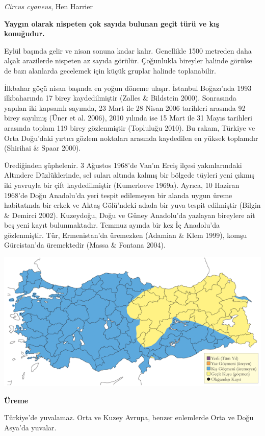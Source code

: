 \documentclass[
  letterpaper,
  DIV=11,
  numbers=noendperiod]{scrreprt}
\begin{document}
\emph{Circus cyaneus}, Hen Harrier

\textbf{Yaygın olarak nispeten çok sayıda bulunan geçit türü ve kış
konuğudur.}

Eylül başında gelir ve nisan sonuna kadar kalır. Genellikle 1500
metreden daha alçak arazilerde nispeten az sayıda görülür. Çoğunlukla
bireyler halinde görülse de bazı alanlarda gecelemek için küçük gruplar
halinde toplanabilir.

İlkbahar göçü nisan başında en yoğun döneme ulaşır. İstanbul Boğazı'nda
1993 ilkbaharında 17 birey kaydedilmiştir (Zalles \& Bildstein 2000).
Sonrasında yapılan iki kapsamlı sayımda, 23 Mart ile 28 Nisan 2006
tarihleri arasında 92 birey sayılmış (Üner et al. 2006), 2010 yılında
ise 15 Mart ile 31 Mayıs tarihleri arasında toplam 119 birey
gözlenmiştir (Topluluğu 2010). Bu rakam, Türkiye ve Orta Doğu'daki
yırtıcı gözlem noktaları arasında kaydedilen en yüksek toplamdır
(Shirihai \& Spaar 2000).

Ürediğinden şüphelenir. 3 Ağustos 1968'de Van'ın Erciş ilçesi
yakınlarındaki Altındere Düzlüklerinde, sel suları altında kalmış bir
bölgede tüyleri yeni çıkmış iki yavruyla bir çift kaydedilmiştir
(Kumerloeve 1969a). Ayrıca, 10 Haziran 1968'de Doğu Anadolu'da yeri
tespit edilemeyen bir alanda uygun üreme habitatında bir erkek ve Aktaş
Gölü'ndeki adada bir yuva tespit edilmiştir (Bilgin \& Demirci 2002).
Kuzeydoğu, Doğu ve Güney Anadolu'da yazlayan bireylere ait beş yeni
kayıt bulunmaktadır. Temmuz ayında bir kez İç Anadolu'da gözlenmiştir.
Tür, Ermenistan'da üremezken (Adamian \& Klem 1999), komşu Gürcistan'da
üremektedir (Massa \& Fontana 2004).

\includegraphics{images/harita_Page_103.png}

\textbf{Üreme}

Türkiye'de yuvalamaz. Orta ve Kuzey Avrupa, benzer enlemlerde Orta ve
Doğu Asya'da yuvalar.
\end{document}
